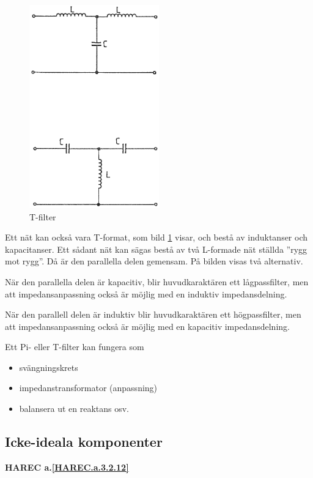 \begin{figure}
\includegraphics[width=0.5\textwidth]{images/cropped_pdfs/bild_2_3-33.pdf}
\caption{T-filter}
\label{fig:BildII3-33}
\end{figure}

Ett nät kan också vara T-format, som bild \ref{fig:BildII3-33} visar, och bestå
av induktanser och kapacitanser.
Ett sådant nät kan sägas bestå av två L-formade nät ställda ''rygg mot rygg''.
Då är den parallella delen gemensam.
På bilden visas två alternativ.

När den parallella delen är kapacitiv, blir huvudkaraktären ett lågpassfilter,
men att impedansanpassning också är möjlig med en induktiv impedansdelning.

När den parallell delen är induktiv blir huvudkaraktären ett högpassfilter, men
att impedansanpassning också är möjlig med en kapacitiv impedansdelning.

Ett Pi- eller T-filter kan fungera som
\begin{itemize}
  \item svängningskrets
  \item impedanstransformator (anpassning)
  \item balansera ut en reaktans osv.
\end{itemize}

\subsection{Icke-ideala komponenter}
\textbf{HAREC a.\ref{HAREC.a.3.2.12}\label{myHAREC.a.3.2.12}}


